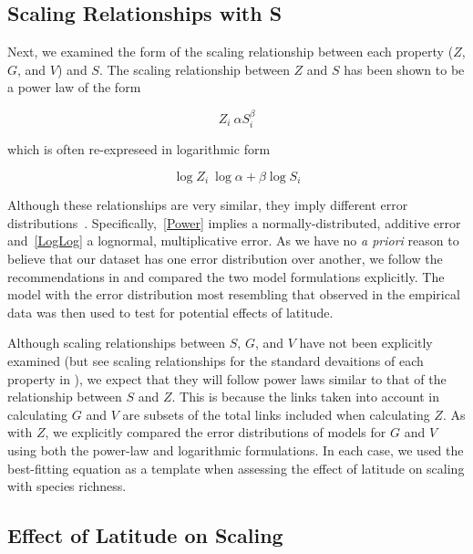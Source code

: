 \documentclass[12pt]{article}
\begin{document}
\subsection*{Scaling Relationships with S}

Next, we examined the form of the scaling relationship between each 
property ($Z$, $G$, and $V$) and $S$. The scaling relationship between $Z$ and 
$S$ has been shown to be a power law \citep{Riede2010} of the form 

\begin{equation}
\label{Power}
Z_{i}~\alpha S_{i}^{\beta}
\end{equation}

which is often re-expreseed in logarithmic form 

\begin{equation}
\label{Loglog}
\log{Z_{i}} ~ \log{\alpha} + \beta\log{S_{i}}
\end{equation}


Although these relationships are very similar, they imply different error distributions~\citep{Xiao2011}.
Specifically,~\ref{Power} implies a normally-distributed, additive error and~\ref{LogLog} a lognormal,
multiplicative error. As we have no \emph{a priori} reason to believe that our dataset has one error distribution
over another, we follow the recommendations in \citet{Xiao2011} and compared the two
model formulations explicitly. The model with the error distribution most resembling that observed in the empirical
data was then used to test for potential effects of latitude.


Although scaling relationships between $S$, $G$, and $V$ have not been explicitly examined (but see scaling 
relationships for the standard devaitions of each property in \citet{Riede2010}), we expect that they will follow
power laws similar to that of the relationship between $S$ and $Z$. This is because the links taken into account in
calculating $G$ and $V$ are subsets of the total links included when calculating $Z$. As with $Z$, we explicitly 
compared the error distributions of models for $G$ and $V$ using both the power-law and logarithmic formulations. 
In each case, we used the best-fitting equation as a template when assessing the effect of latitude on scaling with
species richness.



\subsection*{Effect of Latitude on Scaling}
\end{document}
